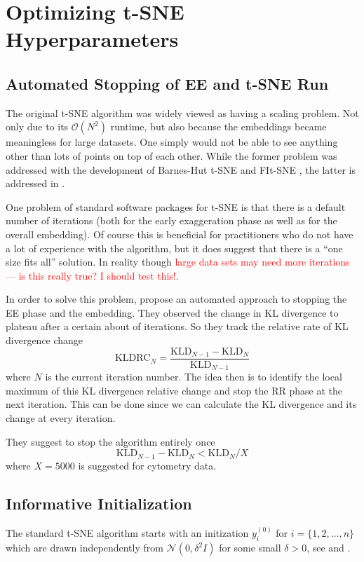 \section{Optimizing t-SNE Hyperparameters}

\subsection{Automated Stopping of EE and t-SNE Run}
The original t-SNE algorithm was widely viewed as having a scaling problem. Not only due to its $\mathcal{O}(N^2)$ runtime, but also because the embeddings became meaningless for large datasets. 
One simply would not be able to see anything other than lots of points on top of each other. 
While the former problem was addressed with the development of Barnes-Hut t-SNE \cite{vdMaa14} and FIt-SNE \cite{Lin19}, the latter is addressed in \cite{belkina19}. 

One problem of standard software packages for t-SNE is that there is a default number of iterations (both for the early exaggeration phase as well as for the overall embedding). 
Of course this is beneficial for practitioners who do not have a lot of experience with the algorithm, but it does suggest that there is a \enquote{one size fits all} solution. 
In reality though \textcolor{red}{large data sets may need more iterations --- is this really true? I should test this!}. 

In order to solve this problem, \cite{belkina19} propose an automated approach to stopping the EE phase and the embedding. 
They observed the change in KL divergence to plateau after a certain about of iterations. 
So they track the relative rate of KL divergence change \begin{equation}\text{KLDRC}_N = \frac{\text{KLD}_{N-1} - \text{KLD}_N}{\text{KLD}_{N-1}}
\end{equation} where $N$ is the current iteration number. 
The idea then is to identify the local maximum of this KL divergence relative change and stop the RR phase at the next iteration. 
This can be done since we can calculate the KL divergence and its change at every iteration. 

They suggest to stop the algorithm entirely once 
\begin{equation}
  \text{KLD}_{N-1} - \text{KLD}_{N} < \text{KLD}_N / X 
\end{equation}
where $X=5000$ is suggested for cytometry data. 

\subsection{Informative Initialization}
The standard t-SNE algorithm starts with an initization $y_i^{(0)}$ for $i=\{1, 2, \dots, n\}$ which are drawn independently from $\mathcal{N}(0, \delta^2 I)$ for some small $\delta > 0$, see \cite{vdMaa08} and \cite{vdMaa14}. 

